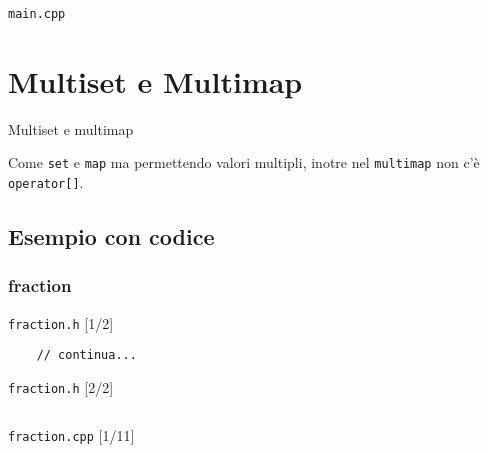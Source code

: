 \documentclass[xcolor={dvipsnames, svgnames, x11names, table}, 10pt]{beamer}
\begin{document}
\begin{frame}{\texttt{main.cpp}}
    
    
\end{frame}

\section{Multiset e Multimap}

\begin{frame}[fragile]{Multiset e multimap}

Come \texttt{set} e \texttt{map} ma permettendo valori multipli, inotre nel \texttt{multimap} non c'è \texttt{operator[]}.

\end{frame}

\subsection{Esempio con codice}

\subsubsection{fraction}

\begin{frame}[fragile]{\texttt{fraction.h} [1/2]}

    
    \begin{verbatim}
    // continua...
    \end{verbatim}
    
\end{frame}

\begin{frame}{\texttt{fraction.h} [2/2]}

\begin{columns}
    \column{\dimexpr\paperwidth-30pt}
\end{columns}

\end{frame}

\begin{frame}{\texttt{fraction.cpp} [1/11]}
    
    
\end{frame}
\end{document}
